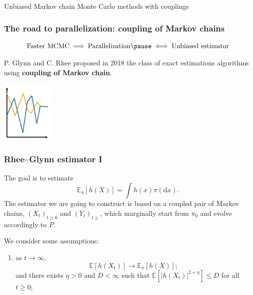 \documentclass{beamer}
\begin{document}
\begin{section}{Unbiased Markov chain Monte Carlo methods with couplings}
	\begin{frame}[plain]{}
		\sectionpage
	\end{frame}

	\begin{frame}
	 	\frametitle{The road to parallelization: coupling of Markov chains}
	 	
	 	$$ \text{Faster MCMC} \implies \text{Parallelization} \pause \iff \text{Unbiased estimator}
	 	$$

		\pause
		\vspace{0.8 cm }
		\begin{minipage}{0.10\textwidth}

		\end{minipage}
		\hfill
		\begin{minipage}{0.45\textwidth}
			P. Glynn and C. Rhee proposed in 2018 the class of exact estimations algorithms using \textbf{coupling of Markov chain}.
		\end{minipage}
		\hfill
		\begin{minipage}{0.40\textwidth}
			\begin{center}
				\includegraphics[height=3cm]{img/markov_coupled}
			\end{center}
		\end{minipage}
		
	\end{frame}

	\begin{frame}
	 	\frametitle{Rhee--Glynn estimator I}
	 	The goal is to estimate
	 	$$
	 	\mathbb{E}_{\pi}[h(X)] 
	 	= \int h(x) \pi (\text{d}x)
	 	.
	 	$$
	 	The estimator we are going to construct is based on a coupled pair of Markov chains, $(X_t)_{t\geq 0}$ and $(Y_t)_{t\geq}$, which marginally start from $\pi_0$ and evolve accordingly to $P$.\\ 
	\end{frame}
	
	\begin{frame}
	 	We consider some assumptions:
	 	\begin{enumerate}
	 		\item as $t \to \infty$, 
	 		$$ \mathbb E [h(X_t)] \to \mathbb E_\pi [h(X)];$$
	 		and there exists $\eta > 0$ and $D < \infty$ such that $\mathbb E [|h(X_t)|^{2 + \eta}] \leq D$ for all $t \geq 0$; %
	 		

\end{enumerate}
\end{frame}
\end{section}
\end{document}
